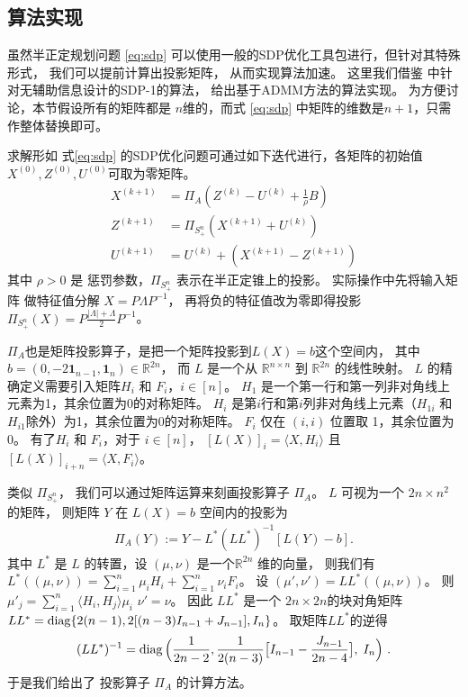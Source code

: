 \subsection{算法实现}\label{sec:sdp_admm}
虽然半正定规划问题 \ref{eq:sdp} 可以使用一般的SDP优化工具包进行，但针对其特殊形式，
我们可以提前计算出投影矩阵，
从而实现算法加速。
这里我们借鉴 \citet{amini2018semidefinite} 中针对无辅助信息设计的SDP-1的算法，
给出基于ADMM方法的算法实现。
为方便讨论，本节假设所有的矩阵都是 $n$维的，而式 \eqref{eq:sdp} 中矩阵的维数是$n+1$，只需作整体替换即可。

求解形如 式\eqref{eq:sdp} 的SDP优化问题可通过如下迭代进行，各矩阵的初始值$X^{(0)},Z^{(0)},U^{(0)}$可取为零矩阵。
\begin{align}
    X^{(k+1)} &= \Pi_A(Z^{(k)} - U^{(k)} + \frac{1}{\rho}B)\label{eq:admm} \\
    Z^{(k+1)} &= \Pi_{S_+^n}(X^{(k+1)} + U^{(k)}) \\
    U^{(k+1)} &= U^{(k)} + (X^{(k+1)} - Z^{(k+1)}) 
    \end{align}
其中 $\rho>0$ 是 惩罚参数，$\Pi_{S_+^n}$ 表示在半正定锥上的投影。
实际操作中先将输入矩阵 做特征值分解 $X=P\Lambda P^{-1}$，
再将负的特征值改为零即得投影$\Pi_{S_+^n}(X)=P\frac{|\Lambda| + \Lambda}{2}P^{-1}$。

$\Pi_A$也是矩阵投影算子，是把一个矩阵投影到$L(X) = b$这个空间内，
其中 $b=(0, -2 \mathbf{1}_{n-1}, \mathbf{1}_{n}) \in \mathbb{R}^{2n}$，
而
$L$ 是一个从 $\mathbb{R}^{n \times n} $ 到 $\mathbb{R}^{2n}$ 的线性映射。
$L$ 的精确定义需要引入矩阵$H_i$ 和 $F_i$，$i\in [n]$。
$H_1$ 是一个第一行和第一列非对角线上元素为1，其余位置为0的对称矩阵。
$H_i$ 是第$i$行和第$i$列非对角线上元素（$H_{1i}$ 和 $H_{i1}$除外）为1，其余位置为0的对称矩阵。
$F_i$ 仅在 $(i,i)$ 位置取 1，其余位置为0。
有了$H_i$ 和 $F_i$，对于 $i \in [n]$，
$[L(X)]_i = \langle X,H_i \rangle$ 且 $[L(X)]_{i+n} = \langle X,F_i \rangle$。

类似 $\Pi_{S_+^n}$， 我们可以通过矩阵运算来刻画投影算子 $\Pi_{A}$。 
$L$ 可视为一个 $2n \times n^2$ 的矩阵，
则矩阵 $Y$ 在 $L(X)=b$ 空间内的投影为
\begin{align}\label{eq:proj:L:Y}
\Pi_{A}(Y) := Y - L^* (L L^*)^{-1}[ L(Y) - b] .
\end{align}
其中 $L^*$  是 $L$ 的转置，设 $(\mu,\nu)$ 是一个$\mathbb{R}^{2n}$ 维的向量，
则我们有 $L^*((\mu,\nu)) = \sum_{i=1}^n \mu_i H_i + \sum_{i=1}^n \nu_i F_i$。
设 $(\mu',\nu')=LL^*((\mu,\nu))$。
则$\mu'_j = \sum_{i=1}^n \langle H_i, H_j \rangle \mu_i$
$\nu'=\nu$。
因此 $L L^*$ 是一个 $2n\times 2n$的块对角矩阵 
$LL^*=\operatorname{diag}\{2(n-1), 2[(n-3)I_{n-1}+J_{n-1}],I_n\} $。
取矩阵$L L^*$的逆得
\begin{align*}
(LL^*)^{-1} = \operatorname{diag}\Big(\frac{1}{2n-2},\frac{1}{2(n-3)} 
\big[ I_{n-1} - \frac{J_{n-1}}{2n-4} \big],\; I_n \Big) \ . 
\end{align*}
于是我们给出了 投影算子 $\Pi_{A} $ 
的计算方法。

